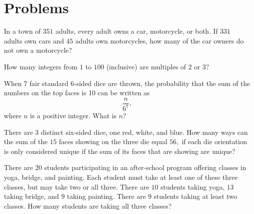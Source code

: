 \documentclass[blue,onecol]{shooting}
\begin{document}
\pagebreak

\section{Problems}


     \begin{prob}[AMC 8 2011/6]{2}
In a town of $351$ adults, every adult owns a car, motorcycle, or both. If $331$ adults own cars and $45$ adults own motorcycles, how many of the car owners do not own a motorcycle?
\end{prob}

     \begin{prob}[]{2}
How many integers from $1$ to $100$ (inclusive) are multiples of $2$ or $3?$
\end{prob}

     \begin{prob}[AMC 10A 2018/11]{3}
When 7 fair standard 6-sided dice are thrown, the probability that the sum of the numbers on the top faces is 10 can be written as\[\frac{n}{6^7},\]where $n$ is a positive integer. What is $n$?
\end{prob}

     \begin{prob}[]{2}
There are $3$ distinct six-sided dice, one red, white, and blue. How many ways can the sum of the $15$ faces showing on the three die equal $56,$ if each die orientation is only considered unique if the sum of its faces that are showing are unique?
\end{prob}
    
     \begin{prob}[AMC 10B 2017/13]{2}
There are $20$ students participating in an after-school program offering classes in yoga, bridge, and painting. Each student must take at least one of these three classes, but may take two or all three. There are $10$ students taking yoga, $13$ taking bridge, and $9$ taking painting. There are $9$ students taking at least two classes. How many students are taking all three classes?
\end{prob}
    
\end{document}
